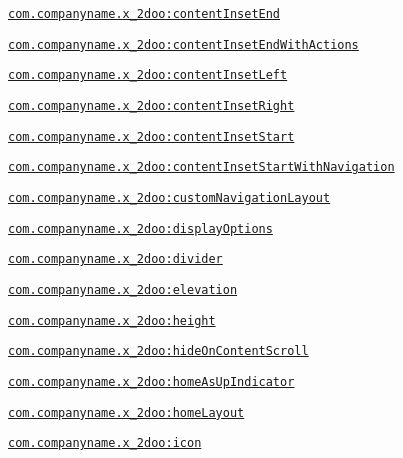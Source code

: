 {\tt \hyperlink{classandroid_1_1support_1_1v4_1_1_r_1_1styleable_2fc65202296211aca68d2f909690758f}{com.companyname.x\_\-2doo:contentInsetEnd}}

{\tt \hyperlink{classandroid_1_1support_1_1v4_1_1_r_1_1styleable_8f6d660506a9045530ddc8d45a060796}{com.companyname.x\_\-2doo:contentInsetEndWithActions}}

{\tt \hyperlink{classandroid_1_1support_1_1v4_1_1_r_1_1styleable_22de0174bc46d66158777df4487ee6d2}{com.companyname.x\_\-2doo:contentInsetLeft}}

{\tt \hyperlink{classandroid_1_1support_1_1v4_1_1_r_1_1styleable_c4907643708a044aecdbc76049dc1be0}{com.companyname.x\_\-2doo:contentInsetRight}}

{\tt \hyperlink{classandroid_1_1support_1_1v4_1_1_r_1_1styleable_4b97a1950d9a8efde8b222a7b18c7301}{com.companyname.x\_\-2doo:contentInsetStart}}

{\tt \hyperlink{classandroid_1_1support_1_1v4_1_1_r_1_1styleable_b66f0db25dbaa8260940ed3b91d9d0c5}{com.companyname.x\_\-2doo:contentInsetStartWithNavigation}}

{\tt \hyperlink{classandroid_1_1support_1_1v4_1_1_r_1_1styleable_f3b2158180d9362405027a8913901587}{com.companyname.x\_\-2doo:customNavigationLayout}}

{\tt \hyperlink{classandroid_1_1support_1_1v4_1_1_r_1_1styleable_60b6f63f434384dc991ae78a8335cef3}{com.companyname.x\_\-2doo:displayOptions}}

{\tt \hyperlink{classandroid_1_1support_1_1v4_1_1_r_1_1styleable_d827f43a76e4f9b7a6f0459ff2a4b5b8}{com.companyname.x\_\-2doo:divider}}

{\tt \hyperlink{classandroid_1_1support_1_1v4_1_1_r_1_1styleable_0516184b1cd0e4ef27327318c1bdc7c4}{com.companyname.x\_\-2doo:elevation}}

{\tt \hyperlink{classandroid_1_1support_1_1v4_1_1_r_1_1styleable_e9d68fc513f852dd01e0da8392efa4d1}{com.companyname.x\_\-2doo:height}}

{\tt \hyperlink{classandroid_1_1support_1_1v4_1_1_r_1_1styleable_d0bacf654ec88cf7bbf7f62214466f22}{com.companyname.x\_\-2doo:hideOnContentScroll}}

{\tt \hyperlink{classandroid_1_1support_1_1v4_1_1_r_1_1styleable_e0ce4cd42f818c233a5c824e297a6329}{com.companyname.x\_\-2doo:homeAsUpIndicator}}

{\tt \hyperlink{classandroid_1_1support_1_1v4_1_1_r_1_1styleable_5bac411a91b290a049eda35aa2ffac76}{com.companyname.x\_\-2doo:homeLayout}}

{\tt \hyperlink{classandroid_1_1support_1_1v4_1_1_r_1_1styleable_7ea505dc252b6d9f9dd2c9e6251d35fe}{com.companyname.x\_\-2doo:icon}}

